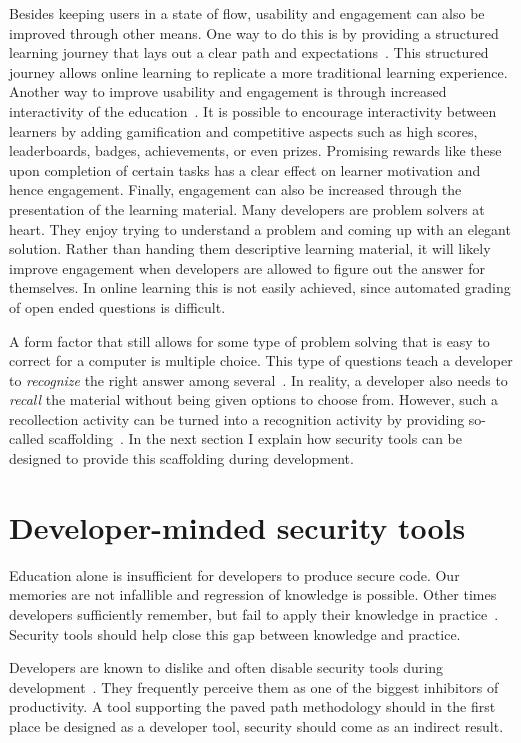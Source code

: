Besides keeping users in a state of flow, usability and engagement can also be improved through other means.
One way to do this is by providing a structured learning journey that lays out a clear path and expectations~\cite{hadi2016driving}.
This structured journey allows online learning to replicate a more traditional learning experience.
Another way to improve usability and engagement is through increased interactivity of the education~\cite{hadi2016driving}.
It is possible to encourage interactivity between learners by adding gamification and competitive aspects such as high scores, leaderboards, badges, achievements, or even prizes.
Promising rewards like these upon completion of certain tasks has a clear effect on learner motivation and hence engagement.
Finally, engagement can also be increased through the presentation of the learning material. Many developers are problem solvers at heart.
They enjoy trying to understand a problem and coming up with an elegant solution.
Rather than handing them descriptive learning material, it will likely improve engagement when developers are allowed to figure out the answer for themselves.
In online learning this is not easily achieved, since automated grading of open ended questions is difficult.

A form factor that still allows for some type of problem solving that is easy to correct for a computer is multiple choice.
This type of questions teach a developer to \textit{recognize} the right answer among several~\citep{dirksen2015design}.
In reality, a developer also needs to \textit{recall} the material without being given options to choose from. However, such a recollection activity can be turned into a recognition activity by providing so-called scaffolding~\cite{maybin1992scaffolding}. In the next section I explain how security tools can be designed to provide this scaffolding during development.

\section{Developer-minded security tools}
Education alone is insufficient for developers to produce secure code.
Our memories are not infallible and regression of knowledge is possible.
Other times developers sufficiently remember, but fail to apply their knowledge in practice~\cite{xie2011programmers}.
Security tools should help close this gap between knowledge and practice. 

Developers are known to dislike and often disable security tools during development~\cite{shiftleftsurvey}. 
They frequently perceive them as one of the biggest inhibitors of productivity. 
A tool supporting the paved path methodology should in the first place be designed as a developer tool, security should come as an indirect result. 

